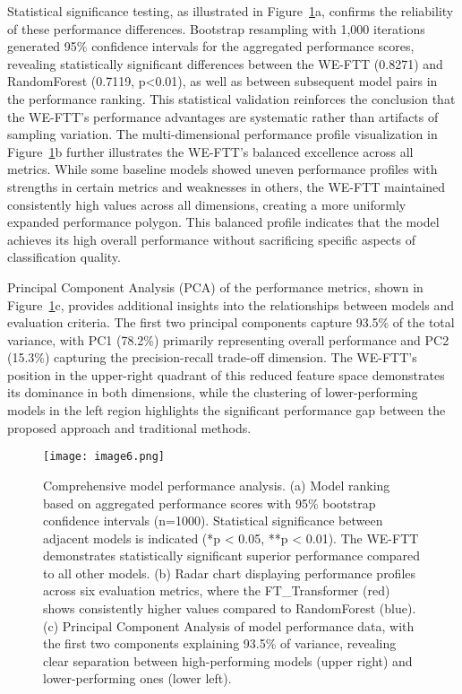 \documentclass[fleqn,10pt]{wlscirep_mdpi_style}
\begin{document}
Statistical significance testing, as illustrated in Figure~\ref{fig:fig6}a, confirms the reliability of these performance differences. Bootstrap resampling with 1,000 iterations generated 95\% confidence intervals for the aggregated performance scores, revealing statistically significant differences between the WE-FTT (0.8271) and RandomForest (0.7119, p<0.01), as well as between subsequent model pairs in the performance ranking. This statistical validation reinforces the conclusion that the WE-FTT's performance advantages are systematic rather than artifacts of sampling variation.
The multi-dimensional performance profile visualization in Figure~\ref{fig:fig6}b further illustrates the WE-FTT's balanced excellence across all metrics. While some baseline models showed uneven performance profiles with strengths in certain metrics and weaknesses in others, the WE-FTT maintained consistently high values across all dimensions, creating a more uniformly expanded performance polygon. This balanced profile indicates that the model achieves its high overall performance without sacrificing specific aspects of classification quality.

Principal Component Analysis (PCA) of the performance metrics, shown in Figure~\ref{fig:fig6}c, provides additional insights into the relationships between models and evaluation criteria. The first two principal components capture 93.5\% of the total variance, with PC1 (78.2\%) primarily representing overall performance and PC2 (15.3\%) capturing the precision-recall trade-off dimension. The WE-FTT's position in the upper-right quadrant of this reduced feature space demonstrates its dominance in both dimensions, while the clustering of lower-performing models in the left region highlights the significant performance gap between the proposed approach and traditional methods.

\begin{figure}[!htbp]
\centering
 \texttt{[image: image6.png]}
\caption{Comprehensive model performance analysis. (a) Model ranking based on aggregated performance scores with 95\% bootstrap confidence intervals (n=1000). Statistical significance between adjacent models is indicated (*p < 0.05, **p < 0.01). The WE-FTT demonstrates statistically significant superior performance compared to all other models. (b) Radar chart displaying performance profiles across six evaluation metrics, where the FT\_Transformer (red) shows consistently higher values compared to RandomForest (blue). (c) Principal Component Analysis of model performance data, with the first two components explaining 93.5\% of variance, revealing clear separation between high-performing models (upper right) and lower-performing ones (lower left).}
\label{fig:fig6}
\end{figure}
\end{document}
